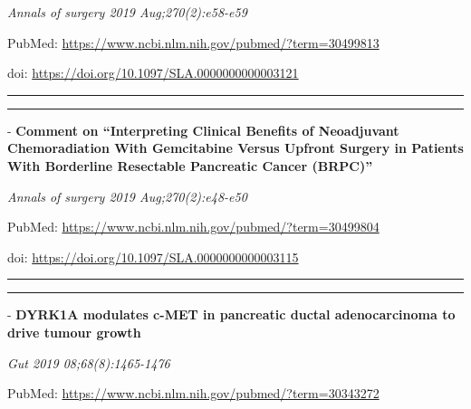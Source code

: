 \documentclass[]{article}
\begin{document}
\emph{Annals of surgery 2019 Aug;270(2):e58-e59}

PubMed: \url{https://www.ncbi.nlm.nih.gov/pubmed/?term=30499813}

doi: \url{https://doi.org/10.1097/SLA.0000000000003121}

{}

{}

\begin{center}\rule{0.5\linewidth}{\linethickness}\end{center}

\begin{center}\rule{0.5\linewidth}{\linethickness}\end{center}

 - \textbf{Comment on ``Interpreting Clinical Benefits of Neoadjuvant
Chemoradiation With Gemcitabine Versus Upfront Surgery in Patients With
Borderline Resectable Pancreatic Cancer (BRPC)''}

\emph{Annals of surgery 2019 Aug;270(2):e48-e50}

PubMed: \url{https://www.ncbi.nlm.nih.gov/pubmed/?term=30499804}

doi: \url{https://doi.org/10.1097/SLA.0000000000003115}

{}

{}

\begin{center}\rule{0.5\linewidth}{\linethickness}\end{center}

\begin{center}\rule{0.5\linewidth}{\linethickness}\end{center}

 - \textbf{DYRK1A modulates c-MET in pancreatic ductal adenocarcinoma to
drive tumour growth}

\emph{Gut 2019 08;68(8):1465-1476}

PubMed: \url{https://www.ncbi.nlm.nih.gov/pubmed/?term=30343272}
\end{document}
